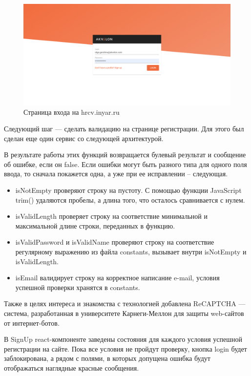 \documentclass[14pt, a4paper]{diplom}
\begin{document}
\begin{figure}[!ht]
\centering
\includegraphics[width=1\textwidth]{resources/signin.png}
\caption{Страница входа на hrcv.inyar.ru}
\label{2}
\end{figure}

Следующий шаг — сделать валидацию на странице регистрации. Для этого был сделан еще один сервис со следующей архитектурой.
\medskip
{}
\medskip

В результате работы этих функций возвращается булевый результат и сообщение об ошибке, если он false.
Если ошибки могут быть разного типа для одного поля ввода, то сначала покажется одна, а уже при ее исправлении -- следующая.
\medskip

\begin{itemize}
\item isNotEmpty проверяют строку на пустоту. С помощью функции JavaScript trim() удаляются пробелы, а длина того, что осталось сравнивается с нулем.
\item isValidLength проверяет строку на соответствие минимальной и максимальной длине строки, переданных в функцию.
\item isValidPassword и isValidName проверяют строку на соответствие регулярному выражению из файла constants, вызывает внутри isNotEmpty и isValidLength.
\item isEmail валидирует строку на корректное написание e-mail, условия успешной проверки хранятся в constants.
\end{itemize}

Также в целях интереса и знакомства с технологией добавлена ReCAPTCHA — система, разработанная в университете Карнеги-Меллон для защиты web-сайтов от интернет-ботов.

В SignUp react-компоненте заведены состояния для каждого условия успешной регистрации на сайте. Пока все условия не пройдут проверку, кнопка login будет заблокирована,
а рядом с полями, в которых допущена ошибка будут отображаться наглядные красные сообщения.
\end{document}

